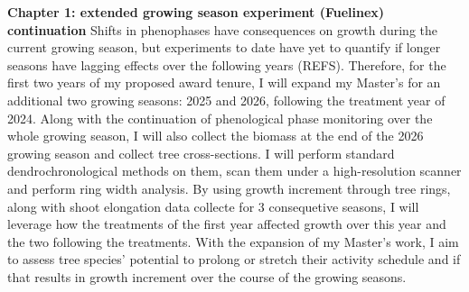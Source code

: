 \documentclass[12pt]{article}
\begin{document}
\textbf{Chapter 1: extended growing season experiment (Fuelinex) continuation}
Shifts in phenophases have consequences on growth during the current growing season, but experiments to date have yet to quantify if longer seasons have lagging effects over the following years (REFS). Therefore, for the first two years of my proposed award tenure, I will expand my Master's for an additional two growing seasons: 2025 and 2026, following the treatment year of 2024. Along with the continuation of phenological phase monitoring over the whole growing season, I will also collect the biomass at the end of the 2026 growing season and collect tree cross-sections. I will perform standard dendrochronological methods on them, scan them under a high-resolution scanner and perform ring width analysis. By using growth increment through tree rings, along with shoot elongation data collecte for 3 consequetive seasons, I will leverage how the treatments of the first year affected growth over this year and the two following the treatments. With the expansion of my Master's work, I aim to assess tree species’ potential to prolong or stretch their activity schedule and if that results in growth increment over the course of the growing seasons. \\
\end{document}
